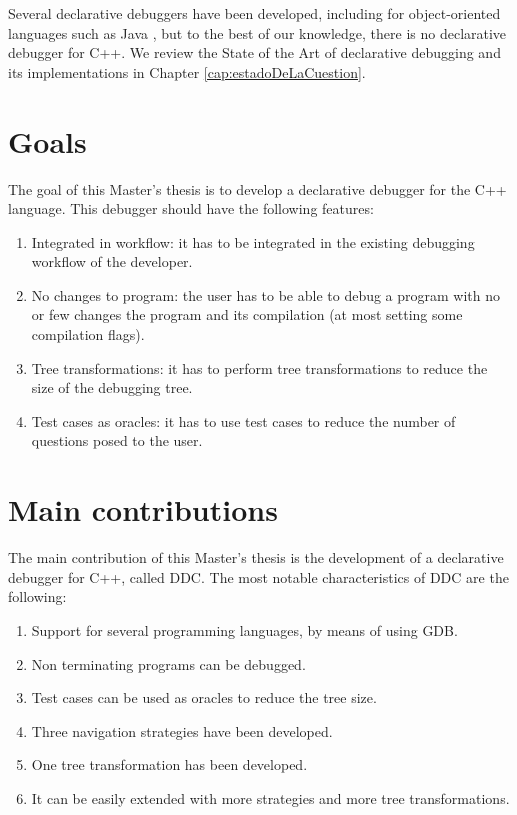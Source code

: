 Several declarative debuggers have been developed, including for object-oriented languages such as Java \cite{DDJ}, but to the best of our knowledge, there is no declarative debugger for C++. We review the State of the Art of declarative debugging and its implementations in Chapter \ref{cap:estadoDeLaCuestion}.

\section{Goals}
The goal of this Master's thesis is to develop a declarative debugger for the C++ language.
This debugger should have the following features:
\begin{enumerate}
  \item Integrated in workflow: it has to be integrated in the existing debugging workflow of the developer. \label{goal1}
  \item No changes to program: the user has to be able to debug a program with no or few changes the program and its compilation (at most setting some compilation flags). \label{goal2}
  \item Tree transformations: it has to perform tree transformations to reduce the size of the debugging tree. \label{goal3}
  \item Test cases as oracles: it has to use test cases to reduce the number of questions posed to the user. \label{goal4}
\end{enumerate}

\section{Main contributions}

The main contribution of this Master's thesis is the development of a declarative debugger for C++, called DDC.
%
The most notable characteristics of DDC are the following:
\begin{enumerate}
\item Support for several programming languages, by means of using GDB.
\item Non terminating programs can be debugged.
\item Test cases can be used as oracles to reduce the tree size.
\item Three navigation strategies have been developed.
\item One tree transformation has been developed.
\item It can be easily extended with more strategies and more tree transformations.
\end{enumerate}

